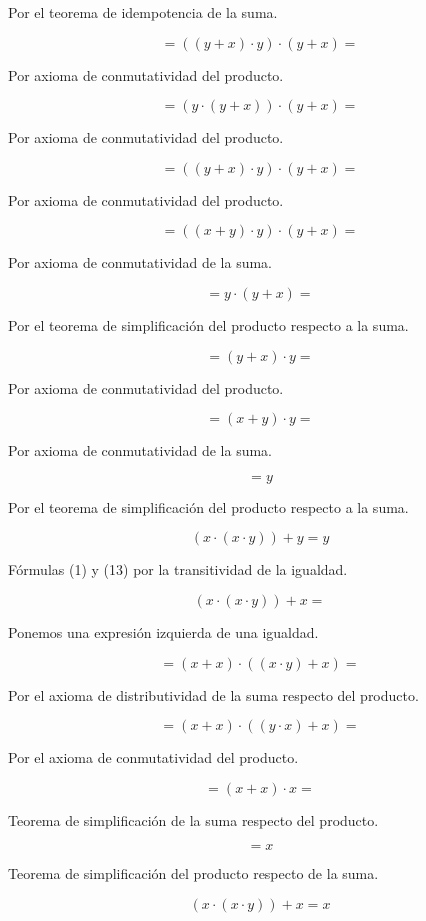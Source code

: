 Por el teorema de idempotencia de la suma.

\[{= {{({{({y + x})} \cdot y})} \cdot {({y + x})}}} =\]

Por axioma de conmutatividad del producto.

\[{= {{({y \cdot {({y + x})}})} \cdot {({y + x})}}} =\]

Por axioma de conmutatividad del producto.

\[{= {{({{({y + x})} \cdot y})} \cdot {({y + x})}}} =\]

Por axioma de conmutatividad del producto.

\[{= {{({{({x + y})} \cdot y})} \cdot {({y + x})}}} =\]

Por axioma de conmutatividad de la suma.

\[{= {y \cdot {({y + x})}}} =\]

Por el teorema de simplificación del producto respecto a la suma.

\[{= {{({y + x})} \cdot y}} =\]

Por axioma de conmutatividad del producto.

\[{= {{({x + y})} \cdot y}} =\]

Por axioma de conmutatividad de la suma.

\[= y\]

Por el teorema de simplificación del producto respecto a la suma.

\[{{({x \cdot {({x \cdot y})}})} + y} = y\]

Fórmulas (1) y (13) por la transitividad de la igualdad.

\[{{({x \cdot {({x \cdot y})}})} + x} = {}\]

Ponemos una expresión izquierda de una igualdad.

\[{= {{({x + x})} \cdot {({{({x \cdot y})} + x})}}} =\]

Por el axioma de distributividad de la suma respecto del producto.

\[{= {{({x + x})} \cdot {({{({y \cdot x})} + x})}}} =\]

Por el axioma de conmutatividad del producto.

\[{= {{({x + x})} \cdot x}} =\]

Teorema de simplificación de la suma respecto del producto.

\[= x\]

Teorema de simplificación del producto respecto de la suma.

\[{{({x \cdot {({x \cdot y})}})} + x} = x\]

